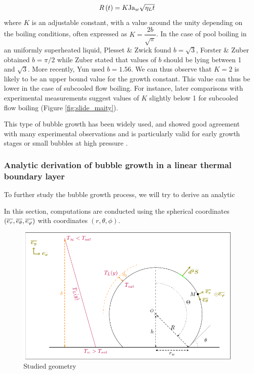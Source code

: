 \begin{equation}
R\left( t \right) = K\mathrm{Ja}_{w} \sqrt{\eta_{L}t}
\end{equation}
where $K$ is an adjustable constant, with a value around the unity depending on the boiling conditions, often expressed as $K=\dfrac{2b}{\sqrt{\pi}}$.  In the case of pool boiling in an uniformly superheated liquid, Plesset \& Zwick \cite{plesset_growth_1954} found $b=\sqrt{3}$, Forster \& Zuber \cite{forster_growth_1954} obtained $b=\pi / 2$ while Zuber  \cite{zuber_dynamics_1961} stated that values of $b$ should be lying between 1 and $\sqrt{3}$. More recently, Yun \etal \cite{yun_prediction_2012} used $b=1.56$. We can thus observe that $K=2$ is likely to be an upper bound value for the growth constant. This value can thus be lower in the case of subcooled flow boiling. For instance, later comparisons with experimental measurements suggest values of $K$ slightly below 1 for subcooled flow boiling (Figure \ref{fig:slide_maity}).

This type of bubble growth has been widely used, and showed good agreement with many experimental observations and is particularly valid for early growth stages or small bubbles at high pressure \cite{kossolapov_experimental_2021, plesset_growth_1954, klausner_vapor_1993}.



\subsubsection{Analytic derivation of bubble growth in a linear thermal boundary layer}

To further study the bubble growth process, we will try to derive an analytic

In this section, computations are conducted using the spherical coordinates $\left(\overline{e_{r}}, \overline{e_{\theta}}, \overline{e_{\varphi}}\right)$ with coordinates $(r, \theta, \phi)$. 

\begin{figure}[h!]
\centering
\includegraphics[width=0.7\linewidth]{img/growth/growth_analytical.pdf}
\caption{Studied geometry}
\label{fig:anal_growth}
\end{figure}

